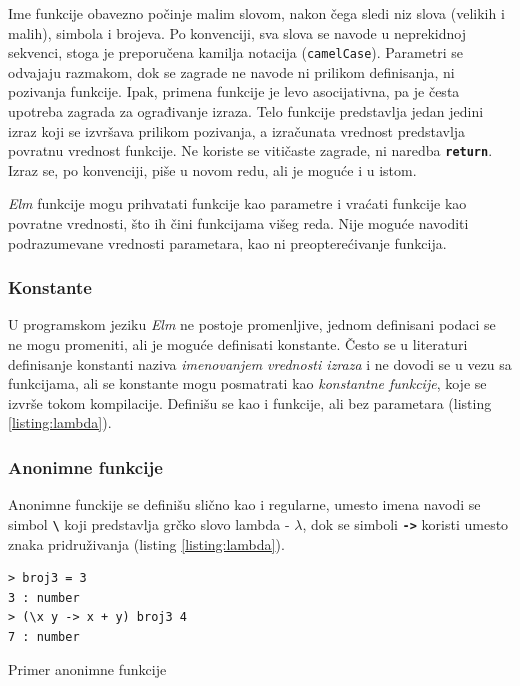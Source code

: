 \documentclass[12pt,oneside]{memoir}
\begin{document}
Ime funkcije obavezno počinje malim slovom, nakon čega sledi niz slova (velikih i malih),
simbola \texttt{\textbf{\textunderscore}} i brojeva. Po konvenciji, sva slova se navode u
neprekidnoj sekvenci, stoga je preporučena kamilja notacija (\texttt{camelCase}).
Parametri se odvajaju razmakom, dok se zagrade ne navode ni prilikom definisanja, ni
pozivanja funkcije. Ipak, primena funkcije je levo asocijativna, pa je česta upotreba
zagrada za ograđivanje izraza. Telo funkcije predstavlja jedan jedini izraz koji se izvršava
prilikom pozivanja, a izračunata vrednost predstavlja povratnu vrednost funkcije. Ne koriste
se vitičaste zagrade, ni naredba \texttt{\textbf{return}}. Izraz se, po konvenciji, piše u
novom redu, ali je moguće i u istom.

\emph{Elm} funkcije mogu prihvatati funkcije kao parametre i vraćati funkcije kao 
povratne vrednosti, što ih čini funkcijama višeg reda. Nije moguće navoditi
podrazumevane vrednosti parametara, kao ni preopterećivanje funkcija.

\subsubsection{Konstante}
U programskom jeziku \emph{Elm} ne postoje promenljive, jednom definisani podaci se ne mogu promeniti, ali je 
moguće definisati konstante. Često se u literaturi definisanje konstanti naziva 
\emph{imenovanjem vrednosti izraza} i ne dovodi se u vezu sa funkcijama, ali se konstante 
mogu posmatrati kao \emph{konstantne funkcije}, koje se izvrše tokom kompilacije. Definišu se
kao i funkcije, ali bez parametara (listing \ref{listing:lambda}).

\subsubsection{Anonimne funkcije}
Anonimne funckije se definišu slično kao i regularne, umesto imena navodi se simbol 
\texttt{\textbf{\textbackslash}} koji predstavlja grčko slovo lambda - \(\lambda\),
dok se simboli \texttt{\textbf{->}} koristi umesto znaka pridruživanja (listing \ref{listing:lambda}).
\begin{listing}[h]
\begin{verbatim}
> broj3 = 3
3 : number
> (\x y -> x + y) broj3 4
7 : number
\end{verbatim}
\caption{Primer anonimne funkcije}
\label{listing:lambda}
\end{listing}
\end{document}
